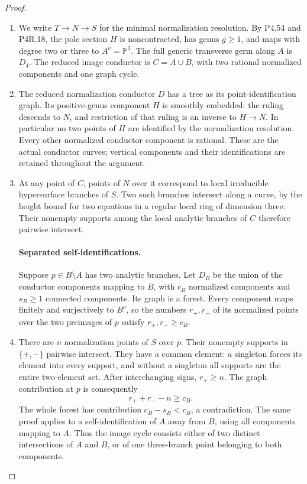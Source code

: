 \begin{proof}

\begin{enumerate}[label={$\langle1\rangle$\arabic*.},leftmargin=*]
\item We write $T\to N\to S$ for the minimal normalization
resolution. By P4.54 and P4R.18, the pole section $H$ is
noncontracted, has genus $g\ge1$, and maps with degree two
or three to $A^\nu=\mathbb P^1$. The full generic transverse
germ along $A$ is $D_4$. The reduced image conductor is
$C=A\cup B$, with two rational normalized components and
one graph cycle.

\item The reduced normalization conductor $D$ has a tree as its
point-identification graph. Its positive-genus component
$H$ is smoothly embedded: the ruling descends to $N$, and
restriction of that ruling is an inverse to $H\to N$.
In particular no two points of $H$ are identified by the
normalization resolution. Every other normalized conductor
component is rational. These are the actual conductor
curves; vertical components and their identifications are
retained throughout the argument.

\item At any point of $C$, points of $N$ over it correspond to
local irreducible hypersurface branches of $S$. Two such
branches intersect along a curve, by the height bound for
two equations in a regular local ring of dimension three.
Their nonempty supports among the local analytic branches
of $C$ therefore pairwise intersect.

\paragraph{Separated self-identifications.}
Suppose $p\in B\setminus A$ has two analytic branches.
Let $D_B$ be the union of the conductor components mapping
to $B$, with $c_B$ normalized components and $s_B\ge1$
connected components. Its graph is a forest. Every component
maps finitely and surjectively to $B^\nu$, so the numbers
$r_+,r_-$ of its normalized points over the two preimages
of $p$ satisfy $r_+,r_-\ge c_B$.

\item There are $n$ normalization points of $S$ over $p$.
Their nonempty supports in $\{+,-\}$ pairwise intersect.
They have a common element: a singleton forces its element
into every support, and without a singleton all supports
are the entire two-element set. After interchanging signs,
$r_+\ge n$. The graph contribution at $p$ is consequently
\[
                  r_++r_--n\ge c_B.
\]
The whole forest has contribution $c_B-s_B<c_B$, a
contradiction. The same proof applies to a self-identification
of $A$ away from $B$, using all components mapping to $A$.
Thus the image cycle consists either of two distinct
intersections of $A$ and $B$, or of one three-branch point
belonging to both components.


\end{enumerate}
\end{proof}
